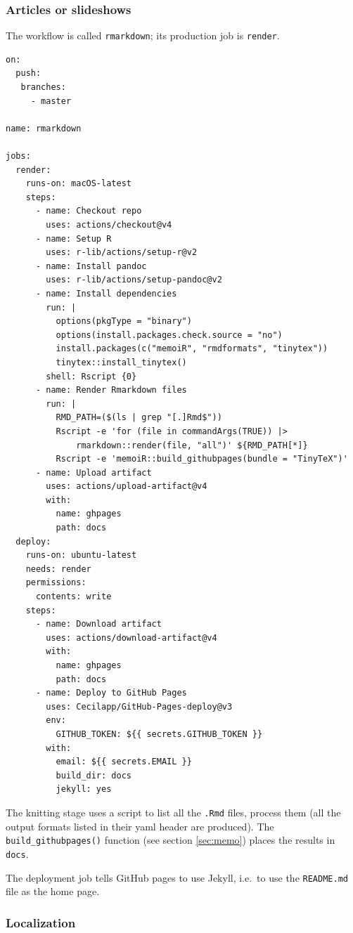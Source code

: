 \documentclass[
  12pt,
  american,
  a4paper,
  extrafontsizes,onecolumn,openright
  ]{memoir}
\begin{document}
\subsubsection{Articles or slideshows}\label{articles-or-slideshows}

The workflow is called \texttt{rmarkdown}; its production job is \texttt{render}.

\begin{verbatim}
on:
  push:
   branches:
     - master

name: rmarkdown

jobs:
  render:
    runs-on: macOS-latest
    steps:
      - name: Checkout repo
        uses: actions/checkout@v4
      - name: Setup R
        uses: r-lib/actions/setup-r@v2
      - name: Install pandoc
        uses: r-lib/actions/setup-pandoc@v2
      - name: Install dependencies
        run: |
          options(pkgType = "binary")
          options(install.packages.check.source = "no")
          install.packages(c("memoiR", "rmdformats", "tinytex"))
          tinytex::install_tinytex()
        shell: Rscript {0}
      - name: Render Rmarkdown files
        run: |
          RMD_PATH=($(ls | grep "[.]Rmd$"))
          Rscript -e 'for (file in commandArgs(TRUE)) |>
              rmarkdown::render(file, "all")' ${RMD_PATH[*]}
          Rscript -e 'memoiR::build_githubpages(bundle = "TinyTeX")'
      - name: Upload artifact
        uses: actions/upload-artifact@v4
        with:
          name: ghpages
          path: docs
  deploy:
    runs-on: ubuntu-latest
    needs: render
    permissions:
      contents: write
    steps:
      - name: Download artifact
        uses: actions/download-artifact@v4
        with:
          name: ghpages
          path: docs
      - name: Deploy to GitHub Pages
        uses: Cecilapp/GitHub-Pages-deploy@v3
        env:
          GITHUB_TOKEN: ${{ secrets.GITHUB_TOKEN }}
        with:
          email: ${{ secrets.EMAIL }}
          build_dir: docs
          jekyll: yes
\end{verbatim}

The knitting stage uses a script to list all the \texttt{.Rmd} files, process them (all the output formats listed in their yaml header are produced).
The \texttt{build\_githubpages()} function (see section \ref{sec:memo}) places the results in \texttt{docs}.

The deployment job tells GitHub pages to use Jekyll, i.e.~to use the \texttt{README.md} file as the home page.

\subsubsection{Localization}\label{localization}
\end{document}

